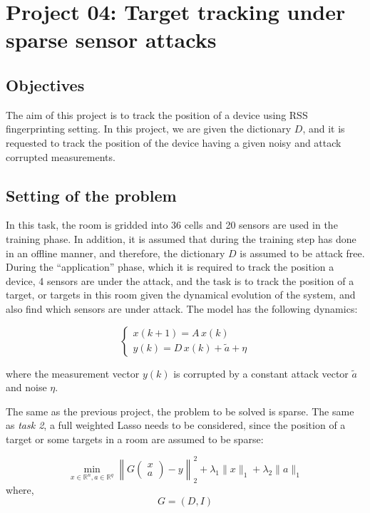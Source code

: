\chapter{Project 04: Target tracking under sparse sensor attacks}

\section{Objectives}
The aim of this project is to track the position of a device using RSS fingerprinting setting. In this project, we are given the dictionary $D$, and it is requested to track the position of the device having a given noisy and attack corrupted measurements.

\section{Setting of the problem}
In this task, the room is gridded into 36 cells and 20 sensors are used in the training phase. In addition, it is assumed that during the training step has done in an offline manner, and therefore, the dictionary $D$ is assumed to be attack free. During the ``application'' phase, which it is required to track the position a device, 4 sensors are under the attack, and the task is to track the position of a target, or targets in this room given the dynamical evolution of the system, and also find which sensors are under attack. The model has the following dynamics:

\begin{equation}
\begin{cases}
x(k+1) = A\,x(k) \\
y(k) = D\,x(k) + \tilde{a} + \eta
\end{cases}
\end{equation}

where the measurement vector $y(k)$ is corrupted by a constant attack vector $\tilde{a}$ and noise $\eta$.

The same as the previous project, the problem to be solved is sparse. The same as \textit{task 2}, a full weighted Lasso needs to be considered, since the position of a target or some targets in a room are assumed to be sparse:

\begin{equation}
\min_{x \in \mathbb{R}^{n}, a \in \mathbb{R}^{q}} \left\| G \begin{pmatrix} x \\ a \end{pmatrix} - y \right\|_2^2 + \lambda_1 \| x \|_1 + \lambda_2 \| a \|_1
\end{equation}
where,
\[
G = (D, I)
\]

